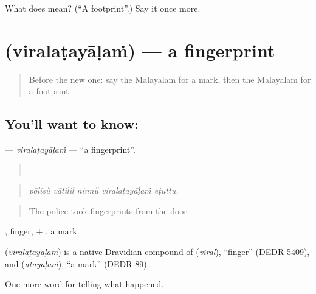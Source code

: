 \begin{tcolorbox}[breakable,colback=teal!4,colframe=teal!35!black,title={Before you move on}]
What does  mean? (\textquotedblleft{}A footprint\textquotedblright{}.) Say it once more.
\end{tcolorbox}
\section[\texorpdfstring{\ml{വിരലടയാളം} (viralaṭayāḷaṁ)}{വിരലടയാളം (viralaṭayāḷaṁ)}]{ (viralaṭayāḷaṁ) — a fingerprint}

\label{lesson:ML-C366-viralatayalam}



\begin{quote}
Before the new one: say the Malayalam for a mark, then the Malayalam for a footprint.
\end{quote}

\subsection*{You'll want to know: }
\textbf{} — \emph{viralaṭayāḷaṁ} — \textquotedblleft{}a fingerprint\textquotedblright{}.

\begin{quote}
    .
\end{quote}

\begin{quote}
\emph{pōlīsŭ vātilil ninnŭ viralaṭayāḷaṁ eṭuttu.}
\end{quote}

\begin{quote}
The police took fingerprints from the door.
\end{quote}

, finger, + , a mark.

\begin{cousinweb}
\textbf{} (\emph{viralaṭayāḷaṁ}) is a native Dravidian compound of  (\emph{viral}), \textquotedblleft{}finger\textquotedblright{} (DEDR 5409), and  (\emph{aṭayāḷaṁ}), \textquotedblleft{}a mark\textquotedblright{} (DEDR 89).
\end{cousinweb}

\begin{grammarlens}[title={What you've built}]
One more word for telling what happened.
\end{grammarlens}

